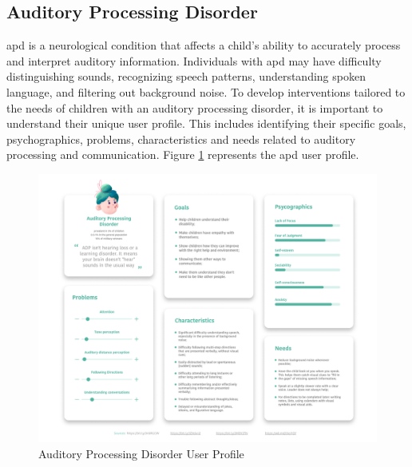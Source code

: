\raggedbottom
\subsection{Auditory Processing Disorder}
\gls{apd} is a neurological condition that affects a child's ability to accurately process and interpret auditory information. Individuals with \gls{apd} may have difficulty distinguishing sounds, recognizing speech patterns, understanding spoken language, and filtering out background noise. To develop interventions tailored to the needs of children with an auditory processing disorder, it is important to understand their unique user profile. This includes identifying their specific goals, psychographics, problems, characteristics and needs related to auditory processing and communication. Figure \ref{fig:APDUserProfile} represents the \gls{apd} user profile.

\begin{figure}[H]
    \centering
    \includegraphics[width=1\linewidth]{Chapters/figma/Auditory Processing Disorder.png}
    \caption{Auditory Processing Disorder User Profile}
    \label{fig:APDUserProfile}
\end{figure}

